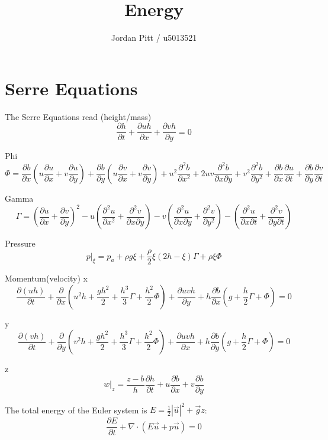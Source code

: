 \documentclass[12pt]{article}
\begin{document}
\title{Energy}
\author{Jordan Pitt / u5013521}

\section{Serre Equations}

The Serre Equations read
(height/mass)
\[\frac{\partial h}{\partial t} + \frac{\partial uh}{\partial x} + \frac{\partial vh}{\partial y} = 0 \]

Phi
\[\Phi = \frac{\partial b}{\partial x}\left(u \frac{\partial u}{\partial x} + v \frac{\partial u }{\partial y}\right) + \frac{\partial b}{\partial y}\left(u \frac{\partial v}{\partial x} + v \frac{\partial v }{\partial y}\right) + u^2 \frac{\partial^2 b}{\partial x^2} + 2uv\frac{\partial^2 b}{\partial x \partial y} + v^2\frac{\partial^2 b}{\partial y^2} + \frac{\partial b}{\partial x}\frac{\partial u}{\partial t} + \frac{\partial b}{\partial y}\frac{\partial v}{\partial t}\]

Gamma
\[\Gamma = \left(\frac{\partial u}{\partial x} + \frac{\partial v}{\partial y}\right)^2 - u \left(\frac{\partial^2 u}{\partial x^2} + \frac{\partial^2 v}{\partial x \partial y}\right) - v \left(\frac{\partial^2 u}{\partial x \partial y} + \frac{\partial^2 v}{\partial y^2}\right) - \left(\frac{\partial^2 u}{\partial x \partial t} + \frac{\partial^2 v}{\partial y \partial t}\right)\]

Pressure
\[p|_\xi = p_a + \rho g \xi + \frac{\rho}{2}\xi\left(2h - \xi\right)\Gamma + \rho \xi \Phi \]


Momentum(velocity)
x
\[ \frac{\partial (uh)}{\partial t} + \frac{\partial}{\partial x}\left(u^2 h + \frac{gh^2}{2} + \frac{h^3}{3}\Gamma + \frac{h^2}{2} \Phi\right) + \frac{\partial uvh}{\partial y} + h \frac{\partial b}{\partial x}\left(g + \frac{h}{2}\Gamma + \Phi\right) = 0\]

y
\[ \frac{\partial (vh)}{\partial t} + \frac{\partial}{\partial y}\left(v^2 h + \frac{gh^2}{2} + \frac{h^3}{3}\Gamma + \frac{h^2}{2} \Phi\right) + \frac{\partial uvh}{\partial x} + h \frac{\partial b}{\partial y}\left(g + \frac{h}{2}\Gamma + \Phi\right) = 0\]

z
\[w|_z = \frac{z - b}{h} \frac{\partial h}{\partial t} + u \frac{\partial b}{\partial x} + v \frac{\partial b}{\partial y}\]

The total energy of the Euler system is $E = \frac{1}{2} |\vec{u}|^2 + \vec{g}z$:
\[\frac{\partial E}{\partial t} + \nabla \cdot \left(E\vec{u} + p\vec{u}\right) = 0\]
\end{document}
